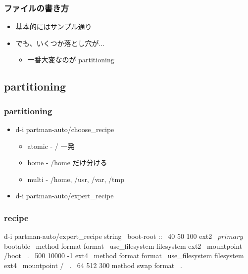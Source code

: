 \documentclass[mingoth,a4paper]{jsarticle}
\begin{document}
\subsubsection{ファイルの書き方}
\begin{itemize}
\item 基本的にはサンプル通り
\item でも、いくつか落とし穴が...
  \begin{itemize}
  \item 一番大変なのが partitioning
  \end{itemize}
\end{itemize}

\subsection{partitioning}

\subsubsection{partitioning}
\begin{itemize}
\item d-i partman-auto/choose\_recipe
  \begin{itemize}
  \item atomic - / 一発
  \item home - /home だけ分ける
  \item multi - /home, /usr, /var, /tmp
  \end{itemize}
\item d-i partman-auto/expert\_recipe
\end{itemize}

\subsubsection{recipe}
\begin{commandline}
d-i partman-auto/expert_recipe string                         \
      boot-root ::                                            \
              40 50 100 ext2                                  \
                      $primary{ } $bootable{ }                \
                      method{ format } format{ }              \
                      use_filesystem{ } filesystem{ ext2 }    \
                      mountpoint{ /boot }                     \
              .                                               \
              500 10000 -1 ext4                               \
                      method{ format } format{ }              \
                      use_filesystem{ } filesystem{ ext4 }    \
                      mountpoint{ / }                         \
              .                                               \
              64 512 300%
                      method{ swap } format{ }                \
              .
\end{commandline}
\end{document}

